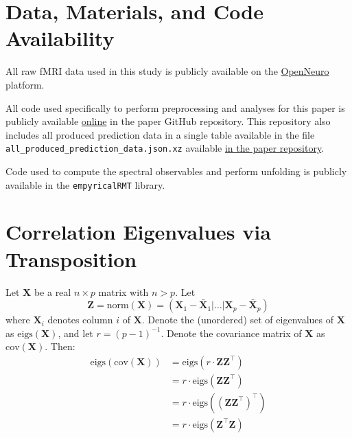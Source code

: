 \documentclass[12pt]{spieman}  %
\newcommand{\code}[1]{\small\texttt{#1}\normalsize}
\begin{document}
\begin{spacing}{2}
\section*{Data, Materials, and Code Availability}
\label{sec:data-and-code}

All raw fMRI data used in this study is publicly available on the
\href{https://openneuro.org/}{OpenNeuro}
platform\cite{poldrackOpenfMRIOpenSharing2017,
markiewiczOpenNeuroResourceSharing2021}.

All code used specifically to perform preprocessing and analyses for this paper
is publicly available
\href{https://github.com/DM-Berger/random-matrix-fmri/}{online} in the paper
GitHub repository\cite{dm-bergerDMBergerRandommatrixfmriPaper2022}. This
repository also includes all produced prediction data in a single table
available in the file \code{all\_produced\_prediction\_data.json.xz} available
\href{https://github.com/DM-Berger/random-matrix-fmri/blob/master/all\_produced\_prediction\_data.json.xz}{in
the paper repository}.

Code used to compute the spectral observables and perform unfolding is publicly
available in the
\href{https://github.com/stfxecutables/empyricalRMT}\code{empyricalRMT}
library\cite{dm-bergerStfxecutablesEmpyricalRMTV12022}.



\newpage



\appendix

\section{Correlation Eigenvalues via Transposition}
\label{sec:transpose}

Let \(\mathbf{X}\) be a real \(n \times p\) matrix with \(n > p\). Let
\[
\mathbf{Z} = \text{norm}(\mathbf{X}) =
\left(
\mathbf{X}_1 - \bar{\mathbf{X}}_1 | \dots | \mathbf{X}_p - \bar{\mathbf{X}}_p
\right)
\]
where \(\mathbf{X}_i\) denotes column \(i\) of \(\mathbf{X}\). Denote the
(unordered) set of eigenvalues of \(\mathbf{X}\) as
\(\text{eigs}(\mathbf{X})\), and let \(r = (p - 1)^{-1}\). Denote the
covariance matrix of \(\mathbf{X}\) as \(\text{cov}(\mathbf{X})\).  Then:
\begin{align*}
\text{eigs}\left( \text{cov}(\mathbf{X})  \right)
&= \text{eigs}(r \cdot \mathbf{Z}\mathbf{Z}^{\top}) \\
&= r \cdot \text{eigs}(\mathbf{Z}\mathbf{Z}^{\top}) \\
&= r \cdot \text{eigs}((\mathbf{Z}\mathbf{Z}^{\top})^{\top}) \\
&= r \cdot \text{eigs}(\mathbf{Z}^{\top}\mathbf{Z}) \\
\end{align*}


\end{spacing}
\end{document}
